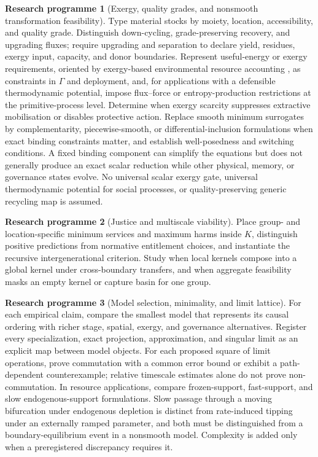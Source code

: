 \documentclass[11pt]{article}
\theoremstyle{definition}
\newtheorem{programme}{Research programme}
\begin{document}
\begin{programme}[Exergy, quality grades, and nonsmooth transformation feasibility]
Type material stocks by moiety, location, accessibility, and quality grade. Distinguish down-cycling, grade-preserving recovery, and upgrading fluxes; require upgrading and separation to declare yield, residues, exergy input, capacity, and donor boundaries. Represent useful-energy or exergy requirements, oriented by exergy-based environmental resource accounting \cite{dewulf2008}, as constraints in $\Gamma$ and deployment, and, for applications with a defensible thermodynamic potential, impose flux--force or entropy-production restrictions at the primitive-process level. Determine when exergy scarcity suppresses extractive mobilisation or disables protective action. Replace smooth minimum surrogates by complementarity, piecewise-smooth, or differential-inclusion formulations when exact binding constraints matter, and establish well-posedness and switching conditions. A fixed binding component can simplify the equations but does not generally produce an exact scalar reduction while other physical, memory, or governance states evolve. No universal scalar exergy gate, universal thermodynamic potential for social processes, or quality-preserving generic recycling map is assumed.
\end{programme}

\begin{programme}[Justice and multiscale viability]
Place group- and location-specific minimum services and maximum harms inside $K$, distinguish positive predictions from normative entitlement choices, and instantiate the recursive intergenerational criterion. Study when local kernels compose into a global kernel under cross-boundary transfers, and when aggregate feasibility masks an empty kernel or capture basin for one group.
\end{programme}

\begin{programme}[Model selection, minimality, and limit lattice]
For each empirical claim, compare the smallest model that represents its causal ordering with richer stage, spatial, exergy, and governance alternatives. Register every specialization, exact projection, approximation, and singular limit as an explicit map between model objects. For each proposed square of limit operations, prove commutation with a common error bound or exhibit a path-dependent counterexample; relative timescale estimates alone do not prove non-commutation. In resource applications, compare frozen-support, fast-support, and slow endogenous-support formulations. Slow passage through a moving bifurcation under endogenous depletion is distinct from rate-induced tipping under an externally ramped parameter, and both must be distinguished from a boundary-equilibrium event in a nonsmooth model. Complexity is added only when a preregistered discrepancy requires it.
\end{programme}
\end{document}
